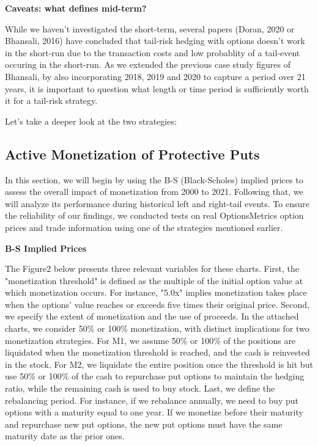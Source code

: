\documentclass[12pt]{article}
\begin{document}
{{\textbf{Caveats: what defines mid-term?}

While we haven't investigated the short-term, several papers (Doran, 2020 or Bhansali, 2016) have concluded that tail-risk hedging with options doesn't work in the short-run due to the transaction costs and low probablity of a tail-event occuring in the short-run. As we extended the previous case study figures of Bhansali, by also incorporating 2018, 2019 and 2020 to capture a period over 21 years, it is important to question what length or time period is sufficiently worth it for a tail-risk strategy. 

Let's take a deeper look at the two strategies:

\subsection{Active Monetization of Protective Puts}
\qquad In this section, we will begin by using the B-S (Black-Scholes) implied prices to assess the overall impact of monetization from 2000 to 2021. Following that, we will analyze its performance during historical left and right-tail events. To ensure the reliability of our findings, we conducted tests on real OptionsMetrics option prices and trade information using one of the strategies mentioned earlier.

\textbf{B-S Implied Prices}

The Figure2 below presents three relevant variables for these charts. First, the "monetization threshold" is defined as the multiple of the initial option value at which monetization occurs. For instance, "5.0x" implies monetization takes place when the options' value reaches or exceeds five times their original price. Second, we specify the extent of monetization and the use of proceeds. In the attached charts, we consider 50\% or 100\% monetization, with distinct implications for two monetization strategies. For M1, we assume 50\% or 100\% of the positions are liquidated when the monetization threshold is reached, and the cash is reinvested in the stock. For M2, we liquidate the entire position once the threshold is hit but use 50\% or 100\% of the cash to repurchase put options to maintain the hedging ratio, while the remaining cash is used to buy stock. Last, we define the rebalancing period. For instance, if we rebalance annually, we need to buy put options with a maturity equal to one year. If we monetize before their maturity and repurchase new put options, the new put options must have the same maturity date as the prior ones.

}}
\end{document}

